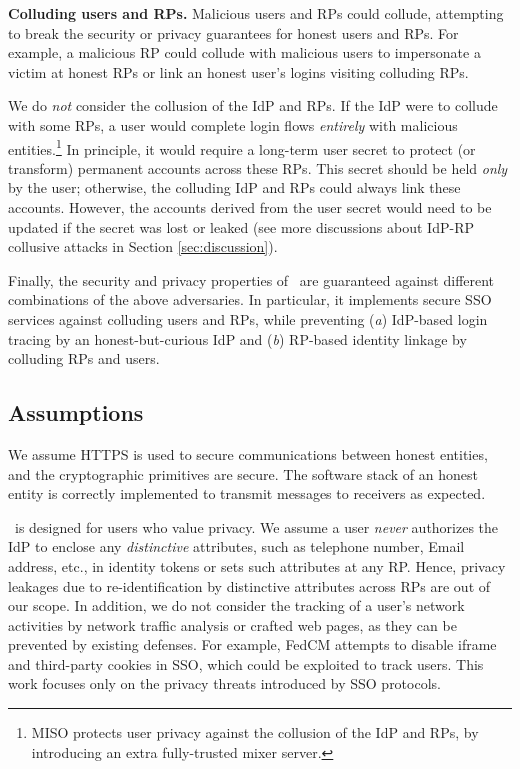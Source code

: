 \noindent \textbf{Colluding users and RPs.}
Malicious users and RPs could collude,
 attempting to break the security or privacy guarantees for honest users and RPs.
For example, a malicious RP could collude with malicious users to %
 impersonate a victim at honest RPs or link an honest user's logins visiting colluding RPs.

We do \emph{not} consider the collusion of the IdP and RPs.
If the IdP were to collude with some RPs, a user would complete login flows \emph{entirely} with malicious entities.\footnote{MISO protects user privacy against the collusion of the IdP and RPs, by introducing an extra fully-trusted mixer server.}
In principle, it would require a long-term user secret to protect (or transform) permanent accounts across these RPs.
This secret should be held \emph{only} by the user; otherwise, the colluding IdP and RPs could always link these accounts.
However, the accounts derived from the user secret would need to be updated if the secret was lost or leaked (see more discussions about IdP-RP collusive attacks in Section \ref{sec:discussion}).

Finally, the security and privacy properties of \usso\ are guaranteed against different combinations of the above adversaries.
In particular, it implements secure SSO services against colluding users and RPs,
        while preventing (\emph{a}) IdP-based login tracing by an honest-but-curious IdP
            and (\emph{b}) RP-based identity linkage by colluding RPs and users.

\subsection{Assumptions}
We assume HTTPS is used to secure communications between honest entities, and the cryptographic primitives are secure. The software stack of an honest entity is correctly implemented to transmit messages to receivers as expected.

\usso\ is designed for users who value privacy. We assume a user \emph{never} authorizes the IdP to enclose any \emph{distinctive} attributes, such as telephone number, Email address, etc., in identity tokens or sets such attributes at any RP. Hence, privacy leakages due to re-identification by distinctive attributes across RPs are out of our scope.
In addition, we do not consider the tracking of a user's network activities by network traffic analysis or crafted web pages, as they can be prevented by existing defenses.
For example, FedCM \cite{FedCM} attempts to disable iframe and third-party cookies in SSO, which could be exploited to track users. This work focuses only on the privacy threats introduced by SSO protocols.



